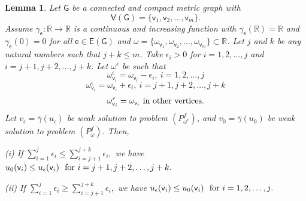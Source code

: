 \documentclass[reqno,12pt]{amsart}
\newtheorem{lemma}[theorem]{Lemma} %
\def\R{\mathbb R} %
\def\e{\mathsf{e}} 	%
\def\v{\mathsf{v}}	%
\newcommand{\G}{\mathsf{G}}	%
\newcommand{\V}{\mathsf{V}}	%
\newcommand{\E}{\mathsf{E}}	%
\numberwithin{equation}{section} %
\begin{document}
\begin{lemma}\label{antepenultimo}
Let  $\G$ be a  connected and compact metric graph with $$\V(\G) = \{ \v_1, \v_2, \ldots, \v_m \}.$$
Assume $\gamma_\e:\mathbb{R}\to \mathbb{R}$ is a  continuous and increasing function with 
$\gamma_\e(\mathbb{R})=\mathbb{R}$ and $\gamma_\e(0)=0$ for all $\e \in \E(\G)$ and 
$\omega=\{\omega_{\v_1},  \omega_{\v_{2}},\ldots,\omega_{\v_m}  \} \subset \R$. Let $j$ and $k$ be any natural numbers  such that $j+k\le m$. Take $\epsilon_i> 0$ for $i=1,2,\ldots,j$ and $i=j+1,j+2,\ldots,j+k$.
 Let $\omega^\epsilon$ be
such that 
$$\omega^\epsilon_{\v_i}=\omega_{\v_i}-\epsilon_i,\ i=1,2,\ldots,j$$
$$\omega^\epsilon_{\v_i}=\omega_{\v_i}+\epsilon_i,\ i=j+1,j+2,\ldots,j+k$$
$$\omega^\epsilon_{\v_i}=\omega_{\v_i}\ \hbox{in other  vertices.}$$ 
Let $v_\epsilon = \overline{\gamma}(u_\epsilon)$ be weak solution  to problem $(P_{\omega^\epsilon}^f)$, and $v_0 = \overline{\gamma}(u_0)$ be weak solution  to problem $(P_{\omega}^f)$. 
 Then, 
\item[(i)] If   $\displaystyle\sum_{i=1}^j\epsilon_i\le \sum_{i=j+1}^{j+k}\epsilon_i,$  we have 
 $ u_0(\v_i) \le u_\epsilon(\v_i)  \ \hbox{ for $i=j+1,j+2,\ldots,j+k$.}$
 \item[(ii)] If   $\displaystyle\sum_{i=1}^j\epsilon_i\ge \sum_{i=j+1}^{j+k}\epsilon_i,$   we have 
 $ u_\epsilon(\v_i) \le u_0(\v_i)  \ \hbox{ for $i=1,2,\ldots,j$.}$
\end{lemma}
\end{document}

